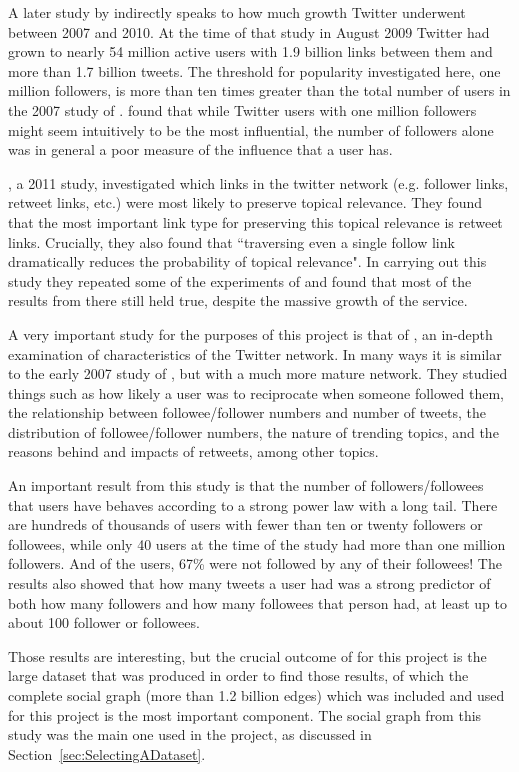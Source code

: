 A later study by \cite{Cha2010} indirectly speaks to how much growth Twitter underwent between 2007 and 2010. At the time of that study in August 2009 Twitter had grown to nearly 54 million active users with 1.9 billion links between them and more than 1.7 billion tweets. The threshold for popularity investigated here, one million followers, is more than ten times greater than the total number of users in the 2007 study of \cite{Java2007}. \cite{Cha2010} found that while Twitter users with one million followers might seem intuitively to be the most influential, the number of followers alone was in general a poor measure of the influence that a user has.

\cite{Welch2011}, a 2011 study, investigated which links in the twitter network (e.g. follower links, retweet links, etc.) were most likely to preserve topical relevance. They found that the most important link type for preserving this topical relevance is retweet links. Crucially, they also found that ``traversing even a single follow link dramatically reduces the probability of topical relevance". In carrying out this study they repeated some of the experiments of \cite{Java2007} and found that most of the results from there still held true, despite the massive growth of the service.

A very important study for the purposes of this project is that of \cite{Kwak2010}, an in-depth examination of characteristics of the Twitter network. In many ways it is similar to the early 2007 study of \cite{Java2007}, but with a much more mature network. They studied things such as how likely a user was to reciprocate when someone followed them, the relationship between followee/follower numbers and number of tweets, the distribution of followee/follower numbers, the nature of trending topics, and the reasons behind and impacts of retweets, among other topics.

An important result from this study is that the number of followers/followees that users have behaves according to a strong power law with a long tail. There are hundreds of thousands of users with fewer than ten or twenty followers or followees, while only 40 users at the time of the study had more than one million followers. And of the users, 67\% were not followed by any of their followees! The results also showed that how many tweets a user had was a strong predictor of both how many followers and how many followees that person had, at least up to about 100 follower or followees.

Those results are interesting, but the crucial outcome of \cite{Kwak2010} for this project is the large dataset that was produced in order to find those results, of which the complete social graph (more than 1.2 billion edges) which was included and used for this project is the most important component. The social graph from this study was the main one used in the project, as discussed in Section~\ref{sec:SelectingADataset}.


